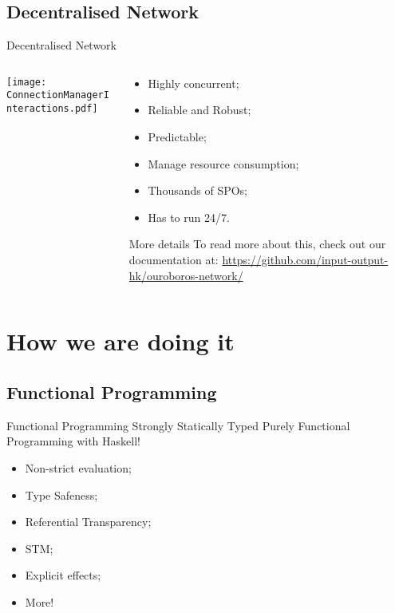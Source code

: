 \documentclass{beamer}
\begin{document}
\subsection*{Decentralised Network}
\begin{frame}{Decentralised Network }
  \begin{columns}
    \begin{column}{0.6\textwidth}
      \vskip0.2cm
      \texttt{[image: ConnectionManagerInteractions.pdf]}
    \end{column}
    \begin{column}{0.4\textwidth}
      \footnotesize
      \begin{itemize}
        \item Highly concurrent;
        \item Reliable and Robust;
        \item Predictable;
        \item Manage resource consumption;
        \item Thousands of SPOs;
        \item Has to run 24/7.
      \end{itemize}

      \tiny
      \begin{block}{More details}
        To read more about this, check out our documentation at:
        \href{https://github.com/input-output-hk/ouroboros-network/}{https://github.com/input-output-hk/ouroboros-network/}
      \end{block}

    \end{column}
  \end{columns}
\end{frame}

\section{How we are doing it}

\subsection*{Functional Programming}

\begin{frame}{Functional Programming}
  Strongly Statically Typed Purely Functional Programming with \alert{Haskell}!

  \begin{itemize}
      \item Non-strict evaluation;
      \item \alert{Type Safeness};
      \item \alert{Referential Transparency};
      \item \alert{STM};
      \item Explicit effects;
      \item More!
  \end{itemize}

\end{frame}
\end{document}
